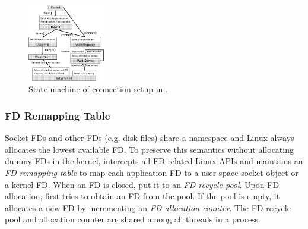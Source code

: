 

\begin{figure}[t!]
	\centering
	\includegraphics[width=0.3\textwidth]{images/conn-setup-new}
	\vspace{-5pt}
	\caption{State machine of connection setup in \libipc{}.}
	\label{fig:conn-setup}
\end{figure}


\subsubsection{FD Remapping Table}
\label{subsubsec:fd-remapping-table}
\quad



Socket FDs and other FDs (e.g. disk files) share a namespace and Linux always allocates the lowest available FD.
To preserve this semantics without allocating dummy FDs in the kernel, \libipc{} intercepts all FD-related Linux APIs and maintains an \emph{FD remapping table} to map each application FD to a user-space socket object or a kernel FD.
When an FD is closed, \libipc{} put it to an \emph{FD recycle pool}.
Upon FD allocation, \libipc{} first tries to obtain an FD from the pool.
If the pool is empty, it allocates a new FD by incrementing an \emph{FD allocation counter}.
The FD recycle pool and allocation counter are shared among all threads in a process.%

